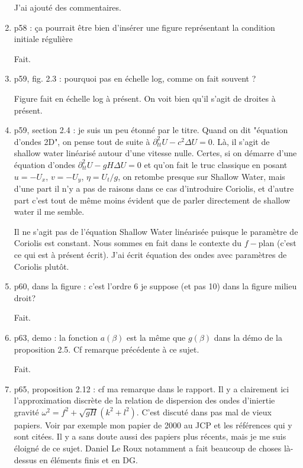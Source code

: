 \documentclass[10pt,a4paper]{article}
\begin{document}
\begin{enumerate}
{\color{blue} J'ai ajouté des commentaires.} 


\item p58 : ça pourrait être bien d’insérer une figure représentant la condition initiale
régulière

{\color{blue} Fait.} 


\item p59, fig. 2.3 : pourquoi pas en échelle log, comme on fait souvent ?

{\color{blue} Figure fait en échelle log à présent. On voit bien qu'il s'agit de droites à présent.} 



\item p59, section 2.4 : je suis un peu étonné par le titre. Quand on dit "équation d'ondes 2D", on pense tout de suite à $\partial^2_{tt}U-c^2 \Delta U =0$. Là, il s'agit de shallow water linéarisé autour d'une vitesse nulle. Certes, si on démarre d'une équation d'ondes $\partial^2_{tt}U-gH \Delta U =0$ et qu'on fait le truc classique en posant $u=-U_x$, $v=-U_y$, $\eta = U_t/g$, on retombe presque sur Shallow Water, mais d'une part il n'y a pas de raisons dans ce cas d'introduire Coriolis, et d'autre part c'est tout de même moins évident que de parler directement de shallow water il me semble.

{\color{blue} Il ne s'agit pas de l'équation Shallow Water linéarisée puisque le paramètre de Coriolis est constant. Nous sommes en fait dans le contexte du $f-$plan (c'est ce qui est à présent écrit). J'ai écrit équation des ondes avec paramètres de Coriolis plutôt.} 


\item p60, dans la figure : c'est l'ordre 6 je suppose (et pas 10) dans la figure milieu droit?

{\color{blue} Fait.} 


\item p63, demo : la fonction $a(\beta)$ est la même que $g(\beta)$ dans la démo de la proposition 2.5. Cf remarque précédente à ce sujet.

{\color{blue} Fait.} 

\item p65, proposition 2.12 : cf ma remarque dans le rapport. Il y a clairement ici l'approximation discrète de la relation de dispersion des ondes d'iniertie gravité $\omega^2 = f^2 + \sqrt{gH}(k^2+l^2)$. C'est discuté dans pas mal de vieux papiers. Voir par exemple mon papier de 2000 au JCP et les références qui y sont citées. Il y a sans doute aussi des papiers plus récents, mais je me suis éloigné de ce sujet. Daniel Le Roux notamment a fait beaucoup de choses là-dessus en éléments finis et en DG.


\end{enumerate}
\end{document}
